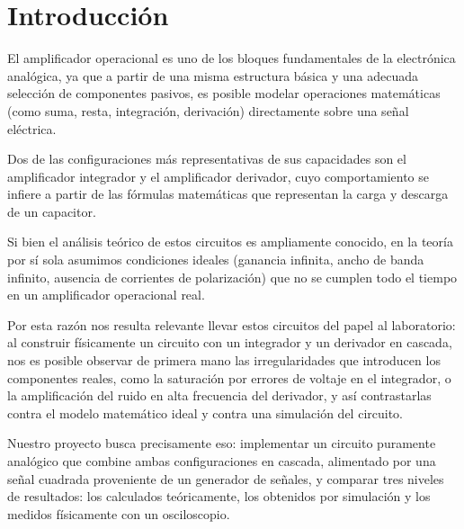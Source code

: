 \documentclass[conference]{IEEEtran}
\begin{document}
\section{Introducción}
El amplificador operacional es uno de los bloques fundamentales de la electrónica analógica, ya que a partir de una misma estructura básica y una adecuada selección de componentes pasivos, es posible modelar operaciones matemáticas (como suma, resta, integración, derivación) directamente sobre una señal eléctrica.

Dos de las configuraciones más representativas de sus capacidades son el amplificador integrador y el amplificador derivador, cuyo comportamiento se infiere a partir de las fórmulas matemáticas que representan la carga y descarga de un capacitor.

Si bien el análisis teórico de estos circuitos es ampliamente conocido, en la teoría por sí sola asumimos condiciones ideales (ganancia infinita, ancho de banda infinito, ausencia de corrientes de polarización) que no se cumplen todo el tiempo en un amplificador operacional real.

Por esta razón nos resulta relevante llevar estos circuitos del papel al laboratorio: al construir físicamente un circuito con un integrador y un derivador en cascada, nos es posible observar de primera mano las irregularidades que introducen los componentes reales, como la saturación por errores de voltaje en el integrador, o la amplificación del ruido en alta frecuencia del derivador, y así contrastarlas contra el modelo matemático ideal y contra una simulación del circuito.

Nuestro proyecto busca precisamente eso: implementar un circuito puramente analógico que combine ambas configuraciones en cascada, alimentado por una señal cuadrada proveniente de un generador de señales, y comparar tres niveles de resultados: los calculados teóricamente, los obtenidos por simulación y los medidos físicamente con un osciloscopio.
\end{document}
